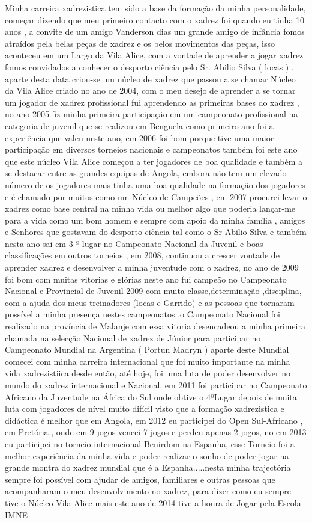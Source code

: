 \begin{multicols}{2}
 Minha carreira xadrezistica tem sido a base da formação da minha personalidade, começar dizendo que meu primeiro contacto com o xadrez foi quando eu tinha 10 anos , a convite de um amigo Vanderson dias um grande amigo de infância fomos atraídos pela belas peças de xadrez e os belos movimentos das peças, isso aconteceu em um Largo da Vila Alice, com a vontade de aprender a jogar xadrez fomos convidados a conhecer o desporto ciência pelo  Sr. Abilio Silva ( locas ) , aparte desta data criou-se um núcleo de xadrez que passou a se chamar Núcleo da Vila Alice criado no ano de 2004, com o meu desejo de aprender a se tornar um jogador de xadrez profissional fui aprendendo as primeiras bases do xadrez , no ano 2005 fiz minha primeira participação em um campeonato profissional na categoria de juvenil que se realizou em Benguela como primeiro ano foi a experiência que valeu neste ano, em 2006 foi bom porque tive uma maior participação em diversos torneios nacionais e campeonatos também foi este ano que este núcleo Vila Alice começou a ter  jogadores de boa qualidade e também a se destacar entre as grandes equipas de Angola, embora não tem um elevado número de os jogadores mais  tinha uma boa qualidade na formação dos jogadores e é chamado por muitos como um Núcleo de Campeões , em 2007 procurei levar o xadrez como base central na minha vida ou melhor algo que poderia lançar-me para a vida como um bom homem e sempre com apoio da minha família , amigos e Senhores que gostavam do desporto ciência tal como o Sr Abilio Silva e também nesta ano  sai em 3 º lugar no Campeonato Nacional da Juvenil e boas classificações em outros torneios , em 2008, continuou a crescer vontade de aprender  xadrez e desenvolver a minha juventude com o xadrez, no ano de 2009  foi bom com muitas vitorias e glórias  neste ano fui campeão no Campeonato Nacional e Provincial de Juvenil  2009 com muita classe,determinação ,disciplina, com a ajuda dos meus treinadores (locas e Garrido) e as pessoas que tornaram possível a minha presença nestes campeonatos ,o Campeonato Nacional foi realizado na província de Malanje com essa vitoria desencadeou a minha primeira chamada na selecção Nacional de xadrez de Júnior para participar no Campeonato Mundial na Argentina ( Portun Madryn ) aparte deste Mundial comecei com minha carreira internacional que foi muito importante na minha vida xadrezistiica desde então, até hoje, foi uma luta de poder desenvolver no mundo do xadrez internacional e Nacional, em 2011 foi participar no Campeonato Africano da Juventude na África do Sul onde obtive o 4ºLugar depois de muita luta com jogadores de nível muito difícil visto que a formação xadrezistica e didáctica é melhor que em Angola, em 2012 eu participei do Open Sul-Africano , em Pretória , onde em 9 jogos vencei 7 jogos e perdeu apenas 2 jogos, no em 2013 eu participei no torneio internacional Benirdom na Espanha, esse Torneio foi a melhor experiência da minha vida e poder realizar o sonho de poder jogar na grande montra do xadrez mundial que é a Espanha.....nesta minha trajectória sempre foi possível com ajudar de amigos, familiares e outras pessoas que acompanharam o meu desenvolvimento no xadrez, para dizer como eu sempre tive o Núcleo Vila Alice mais este ano de 2014 tive a honra de Jogar pela Escola IMNE - 
\end{multicols}
